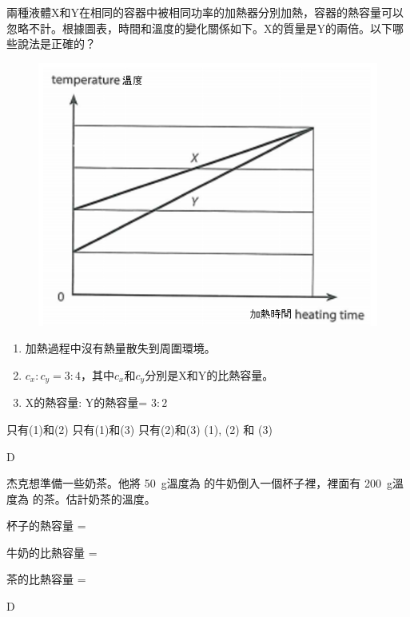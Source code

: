 {
    兩種液體X和Y在相同的容器中被相同功率的加熱器分別加熱，容器的熱容量可以忽略不計。根據圖表，時間和溫度的變化關係如下。X的質量是Y的兩倍。以下哪些說法是正確的？
    \begin{figure}[h]
        \centering
        \includegraphics[width=0.5\linewidth]{assets/16.png}
    \end{figure}
    \begin{enumerate}[label=\sd]
        \item 加熱過程中沒有熱量散失到周圍環境。
        \item $c_x: c_y=3:4$，其中$c_x$和$c_y$分別是X和Y的比熱容量。
        \item X的熱容量: Y的熱容量= $3:2$
    \end{enumerate}
    \begin{choices}
        \choice 只有(1)和(2)
        \choice 只有(1)和(3)
        \choice 只有(2)和(3)
        \CorrectChoice (1), (2) 和 (3)
    \end{choices}
}{\mckey D}

{
    杰克想準備一些奶茶。他將 \qty{50}{g}溫度為 的牛奶倒入一個杯子裡，裡面有 \qty{200}{g}溫度為 的茶。估計奶茶的溫度。
    \par 杯子的熱容量 = 
    \par 牛奶的比熱容量 = 
    \par 茶的比熱容量  = 

    \begin{choices}
        \choice {}
        \choice {}
        \choice {}
        \CorrectChoice {}
    \end{choices}
}{\mckey D}

